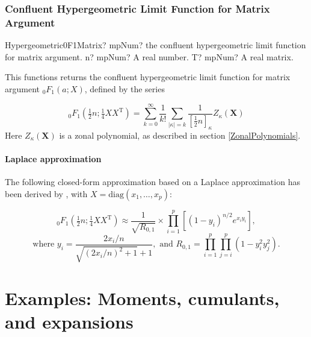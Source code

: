 \newpage
\subsection{Confluent Hypergeometric Limit Function for Matrix Argument}
\label{Hypergeometric0F1Matrix}


\begin{mpFunctionsExtract}
	\mpFunctionTwoNotImplemented
	{Hypergeometric0F1Matrix? mpNum? the confluent hypergeometric limit function for matrix argument.}
	{n? mpNum? A real number.}
	{T? mpNum? A real matrix.}	
\end{mpFunctionsExtract}


\vspace{0.3cm}
This functions returns the confluent hypergeometric limit function for matrix argument ${}_0F_1(a; X)$, defined by the series \citep{NIST,Butler_Wood_2003}

\begin{equation}
	{}_0F_1(\tfrac{1}{2}n;\tfrac{1}{4}XX^{\text{T}}) = \sum_{k=0}^\infty \frac{1}{k!}  \sum_{|\kappa|=k}  \frac{1}{\left[\tfrac{1}{2}n\right]_{\kappa}} Z_{\kappa}(\textbf{X})
\end{equation}
Here $Z_{\kappa}(\textbf{X})$ is a zonal polynomial, as described in section \ref{ZonalPolynomials}.



\subsubsection{Laplace approximation}
The following closed-form approximation based on a Laplace approximation has been derived by \cite{Butler_Wood_2003}, with $X=\text{diag}(x_1,\ldots,x_p)$:

\begin{equation}
	{}_0{F}_1 \left(\tfrac{1}{2}n;\tfrac{1}{4}XX^{\text{T}} \right)  \approx \frac{1}{\sqrt{R_{0,1}}}  \times \prod_{i=1}^p \left[(1-y_i)^{n/2} e^{x_i y_i}  \right],
\end{equation}
\begin{equation*}
	\text{where } y_i=\frac{2x_i/n}{\sqrt{(2x_i/n)^2 + 1}+1}, \text{ and } R_{0,1} = \prod_{i=1}^p  \prod_{j=i}^p (1-y_i^2 y_j^2). 
\end{equation*}





\chapter{Examples: Moments, cumulants, and expansions}


